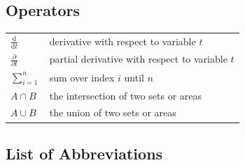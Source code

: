 \documentclass[english, 12pt, a4paper, elec, utf8, a-1b, online]{aaltothesis}
\begin{document}
\subsection*{Operators}
\begin{tabular}{ll}
$\displaystyle\frac{\mbox{d}}{\mbox{d} t}$ & derivative with respect to 
variable $t$\\[3mm]
$\displaystyle\frac{\partial}{\partial t}$  & partial derivative with respect 
to variable $t$ \\[3mm]
$\sum_{i=1}^{n}$                      & sum over index $i$ until $n$\\
$A \cap B$ & the intersection of two sets or areas\\
$A \cup B$ & the union of two sets or areas\\
\end{tabular}

\subsection*{List of Abbreviations}
\end{document}
